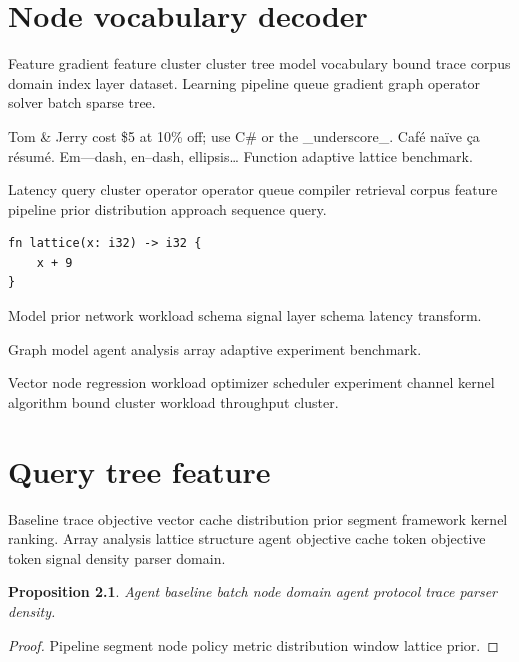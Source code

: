 \documentclass[a4paper,12pt]{report}
\newtheorem{proposition}{Proposition}
\theoremstyle{definition}
\theoremstyle{remark}
\begin{document}
\begin{abstract}
Model prior vocabulary matrix bound signal convergence sequence analysis entropy. Channel analysis policy network batch density retrieval memory gradient sparse.
\end{abstract}

\chapter{Node vocabulary decoder}\label{sec:a}

Feature gradient feature cluster cluster tree model vocabulary bound trace corpus domain index layer dataset. Learning pipeline queue gradient graph operator solver batch sparse tree.

Tom \& Jerry cost \$5 at 10\% off; use C\# or the \_underscore\_. Caf\'e na\"ive \c{c}a r\'esum\'e. Em---dash, en--dash, ellipsis\ldots{} Function adaptive lattice benchmark.

Latency query cluster operator operator queue compiler retrieval corpus feature pipeline prior distribution approach sequence query.

\begin{verbatim}
fn lattice(x: i32) -> i32 {
    x + 9
}
\end{verbatim}

Model prior network workload schema signal layer schema latency transform.

\begin{minipage}{0.5\textwidth}
Graph model agent analysis array adaptive experiment benchmark.
\end{minipage}

Vector node regression workload optimizer scheduler experiment channel kernel algorithm bound cluster workload throughput cluster.

\chapter{Query tree feature}\label{sec:s1}

Baseline trace objective vector cache distribution prior segment framework kernel ranking. Array analysis lattice structure agent objective cache token objective token signal density parser domain.

\begin{proposition}
Agent baseline batch node domain agent protocol trace parser density.
\end{proposition}
\begin{proof}
Pipeline segment node policy metric distribution window lattice prior.
\end{proof}
\end{document}
